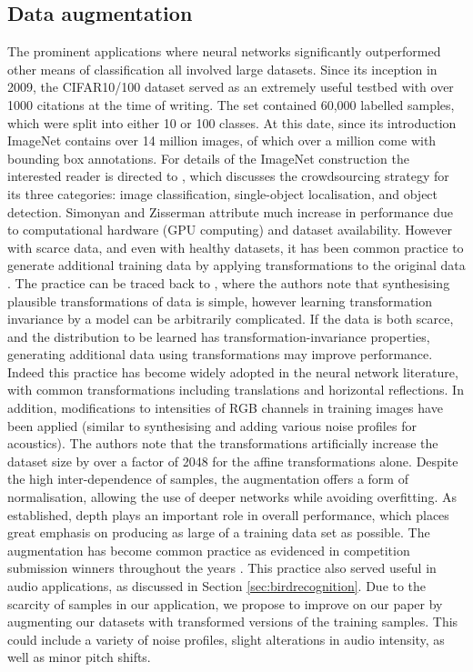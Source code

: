 \documentclass[12pt]{llncs}
\begin{document}
\subsection{Data augmentation}
The prominent applications where neural networks significantly outperformed other means of classification all involved large datasets. Since its inception in 2009, the CIFAR10/100 dataset \cite{krizhevsky2009learning} served as an extremely useful testbed with over 1000 citations at the time of writing. The set contained 60,000 labelled samples, which were split into either 10 or 100 classes. At this date, since its introduction ImageNet contains over 14 million images, of which over a million come with bounding box annotations. For details of the ImageNet construction the interested reader is directed to \cite[Section 3]{ILSVRC15}, which discusses the crowdsourcing strategy for its three categories: image classification, single-object localisation, and object detection. Simonyan and Zisserman \cite{simonyan2014very} attribute much increase in performance due to computational hardware (GPU computing) and dataset availability. However with scarce data, and even with healthy datasets, it has been common practice to generate additional training data by applying transformations to the original data \cite{hinton2012improving}. The practice can be traced back to \cite{simard2003best}, where the authors note that synthesising plausible transformations of data is simple, however learning transformation invariance by a model can be arbitrarily complicated. If the data is both scarce, and the distribution to be learned has transformation-invariance properties, generating additional data using transformations may improve performance. Indeed this practice has become widely adopted in the neural network literature, with common transformations including translations and horizontal reflections. In addition, modifications to intensities of RGB channels in training images \cite{krizhevsky2012imagenet} have been applied (similar to synthesising and adding various noise profiles for acoustics). The authors note that the transformations artificially increase the dataset size by over a factor of 2048 for the affine transformations alone. Despite the high inter-dependence of samples, the augmentation offers a form of normalisation, allowing the use of deeper networks while avoiding overfitting. As established, depth plays an important role in overall performance, which places great emphasis on producing as large of a training data set as possible. The augmentation has become common practice as evidenced in competition submission winners throughout the years \cite{simonyan2014very,he2016deep,krizhevsky2012imagenet}. This practice also served useful in audio applications, as discussed in Section \ref{sec:birdrecognition}. Due to the scarcity of samples in our application, we propose to improve on our paper by augmenting our datasets with transformed versions of the training samples. This could include a variety of noise profiles, slight alterations in audio intensity, as well as minor pitch shifts.
\end{document}

